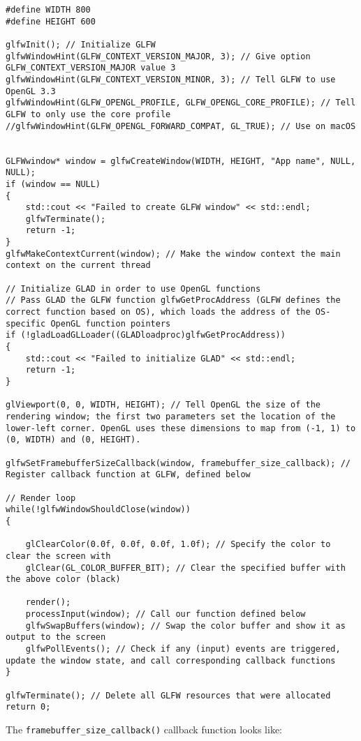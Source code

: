 \documentclass[8pt, table, xcdraw]{article}%
\begin{document}
\begin{lstlisting}
#define WIDTH 800
#define HEIGHT 600

glfwInit(); // Initialize GLFW
glfwWindowHint(GLFW_CONTEXT_VERSION_MAJOR, 3); // Give option GLFW_CONTEXT_VERSION_MAJOR value 3
glfwWindowHint(GLFW_CONTEXT_VERSION_MINOR, 3); // Tell GLFW to use OpenGL 3.3
glfwWindowHint(GLFW_OPENGL_PROFILE, GLFW_OPENGL_CORE_PROFILE); // Tell GLFW to only use the core profile
//glfwWindowHint(GLFW_OPENGL_FORWARD_COMPAT, GL_TRUE); // Use on macOS


GLFWwindow* window = glfwCreateWindow(WIDTH, HEIGHT, "App name", NULL, NULL);
if (window == NULL)
{
    std::cout << "Failed to create GLFW window" << std::endl;
    glfwTerminate();
    return -1;
}
glfwMakeContextCurrent(window); // Make the window context the main context on the current thread

// Initialize GLAD in order to use OpenGL functions
// Pass GLAD the GLFW function glfwGetProcAddress (GLFW defines the correct function based on OS), which loads the address of the OS-specific OpenGL function pointers
if (!gladLoadGLLoader((GLADloadproc)glfwGetProcAddress))
{
    std::cout << "Failed to initialize GLAD" << std::endl;
    return -1;
}

glViewport(0, 0, WIDTH, HEIGHT); // Tell OpenGL the size of the rendering window; the first two parameters set the location of the lower-left corner. OpenGL uses these dimensions to map from (-1, 1) to (0, WIDTH) and (0, HEIGHT).

glfwSetFramebufferSizeCallback(window, framebuffer_size_callback); // Register callback function at GLFW, defined below

// Render loop
while(!glfwWindowShouldClose(window))
{
    
    glClearColor(0.0f, 0.0f, 0.0f, 1.0f); // Specify the color to clear the screen with
    glClear(GL_COLOR_BUFFER_BIT); // Clear the specified buffer with the above color (black)

    render();
    processInput(window); // Call our function defined below
    glfwSwapBuffers(window); // Swap the color buffer and show it as output to the screen
    glfwPollEvents(); // Check if any (input) events are triggered, update the window state, and call corresponding callback functions
}

glfwTerminate(); // Delete all GLFW resources that were allocated
return 0;
\end{lstlisting}

The \lstinline{framebuffer_size_callback()} callback function looks like:
\end{document}
